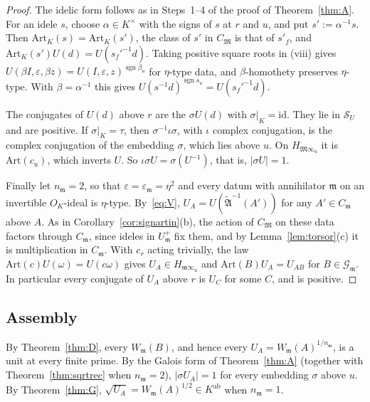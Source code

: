 \documentclass[11pt]{amsart}
\numberwithin{equation}{section}
\theoremstyle{plain}
\theoremstyle{definition}
\theoremstyle{remark}
\begin{document}
\begin{proof}
The idelic form follows as in Steps~1--4 of the proof of Theorem~\ref{thm:A}. For an idele \(s\), choose \(\alpha\in K^\times\) with the signs of \(s\) at \(r\) and \(u\), and put \(s':=\alpha^{-1}s\). Then \(\mathrm{Art}_K(s)=\mathrm{Art}_K(s')\), the class of \(s'\) in \(C_{\mathfrak M}\) is that of \(s'_f\), and \(\mathrm{Art}_K(s')U(d)=U(s_f'^{-1}d)\). Taking positive square roots in (viii) gives \(U(\beta I,\varepsilon,\beta z)=U(I,\varepsilon,z)^{\operatorname{sgn}\beta_u}\) for \(\eta\)-type data, and \(\beta\)-homothety preserves \(\eta\)-type. With \(\beta=\alpha^{-1}\) this gives \(U(s^{-1}d)^{\operatorname{sgn}s_u}=U(s_f'^{-1}d)\).

The conjugates of \(U(d)\) above \(r\) are the \(\sigma U(d)\) with \(\sigma|_K=\mathrm{id}\). They lie in \(\mathcal S_U\) and are positive. If \(\sigma|_K=\tau\), then \(\sigma^{-1}\iota\sigma\), with \(\iota\) complex conjugation, is the complex conjugation of the embedding \(\sigma\), which lies above \(u\). On \(H_{\mathfrak M\infty_u}\) it is \(\mathrm{Art}(c_u)\), which inverts \(U\). So \(\iota\sigma U=\sigma(U^{-1})\), that is, \(|\sigma U|=1\).

Finally let \(n_{\mathfrak m}=2\), so that \(\varepsilon=\varepsilon_{\mathfrak m}=\eta^2\) and every datum with annihilator \(\mathfrak m\) on an invertible \(O_K\)-ideal is \(\eta\)-type. By~\eqref{eq:V}, \(U_A=U(\widetilde{\mathfrak A}^{-1}(A'))\) for any \(A'\in C_{\mathfrak m}\) above \(A\). As in Corollary~\ref{cor:signartin}(b), the action of \(C_{\mathfrak M}\) on these data factors through \(C_{\mathfrak m}\), since ideles in \(U_{\mathfrak m}^+\) fix them, and by Lemma~\ref{lem:torsor}(c) it is multiplication in \(C_{\mathfrak m}\). With \(c_r\) acting trivially, the law \(\mathrm{Art}(c)U(\omega)=U(c\omega)\) gives \(U_A\in H_{\mathfrak m\infty_u}\) and \(\mathrm{Art}(B)U_A=U_{AB}\) for \(B\in\mathcal G_{\mathfrak m}\). In particular every conjugate of \(U_A\) above \(r\) is \(U_C\) for some \(C\), and is positive.
\end{proof}

\subsection{Assembly}\label{sec:assembly}

By Theorem~\ref{thm:D}, every \(W_{\mathfrak m}(B)\), and hence every \(U_A=W_{\mathfrak m}(A)^{1/n_{\mathfrak m}}\), is a unit at every finite prime. By the Galois form of Theorem~\ref{thm:A} (together with Theorem~\ref{thm:sqrtrec} when \(n_{\mathfrak m}=2\)), \(|\sigma U_A|=1\) for every embedding \(\sigma\) above \(u\). By Theorem~\ref{thm:G}, \(\sqrt{U_A}=W_{\mathfrak m}(A)^{1/2}\in K^{\mathrm{ab}}\) when \(n_{\mathfrak m}=1\).
\end{document}
